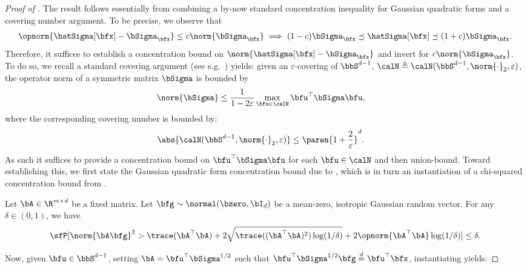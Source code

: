 \begin{proof}[Proof of ]
    The result follows essentially from combining a by-now standard concentration inequality for Gaussian quadratic forms and a covering number argument. To be precise, we observe that
    \begin{align*}
        \opnorm{\hatSigma[\bfx] - \bSigma_\bfx} \leq c\norm{\bSigma_\bfx} \implies (1-c)\bSigma_\bfx \preceq \hatSigma[\bfx] \preceq (1+c)\bSigma_\bfx.
    \end{align*}
    Therefore, it suffices to establish a concentration bound on $\norm{\hatSigma[\bfx] - \bSigma_\bfx}$ and invert for $c\norm{\bSigma_\bfx}$. To do so, we recall a standard covering argument (see e.g.\ \citet[Chapter 4]{vershynin2018high}) yields: given an $\varepsilon$-covering of $\bbS^{d-1}$, $\calN \triangleq \calN(\bbS^{d-1}, \norm{\cdot}_2, \varepsilon)$, the operator norm of a symmetric matrix $\bSigma$ is bounded by
    \begin{align*}
        \norm{\bSigma} &\leq \frac{1}{1 - 2\varepsilon} \max_{\bfu \in \calN} \bfu^\top \bSigma \bfu,
    \end{align*}
    where the corresponding covering number is bounded by:
    \begin{align*}
        \abs{\calN(\bbS^{d-1}, \norm{\cdot}_2, \varepsilon)} &\leq \paren{1 + \frac{2}{\varepsilon}}^d.
    \end{align*}
    As such it suffices to provide a concentration bound on $\bfu^\top \bSigma \bfu$ for each $\bfu \in \calN$ and then union-bound. Toward establishing this, we first state the Gaussian quadratic form concentration bound due to \citet{hsu2012random}, which is in turn an instantiation of a chi-squared concentration bound from \citet{laurent2000adaptive}.
    \begin{proposition}\label{prop:hsu_quad_form}
        Let $\bA \in \R^{m \times d}$ be a fixed matrix. Let $\bfg \sim \normal(\bzero, \bI_d)$ be a mean-zero, isotropic Gaussian random vector. For any $\delta \in (0,1)$, we have
        \begin{align*}
            \sfP[\norm{\bA \bfg}^2 > \trace(\bA^\top \bA) + 2\sqrt{\trace((\bA^\top \bA)^2) \log(1/\delta)} + 2\opnorm{\bA^\top \bA} \log(1/\delta)] \leq \delta.
        \end{align*}
    \end{proposition}
    Now, given $\bfu \in \bbS^{d-1}$, setting $\bA = \bfu^\top \bSigma^{1/2}$ such that $\bfu^\top \bSigma^{1/2} \bfg \overset{d}{=} \bfu^\top \bfx$, instantiating  yields:

\end{proof}
